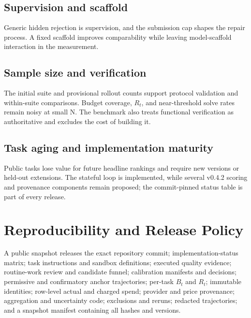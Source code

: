 \documentclass[11pt]{article}
\begin{document}
\subsection{Supervision and scaffold}\hypertarget{133-supervision-and-scaffold}{}\label{133-supervision-and-scaffold}

Generic hidden rejection is supervision, and the submission cap shapes the repair process. A fixed scaffold improves comparability while leaving model-scaffold interaction in the measurement.

\subsection{Sample size and verification}\hypertarget{134-sample-size-and-verification}{}\label{134-sample-size-and-verification}

The initial suite and provisional rollout counts support protocol validation and within-suite comparisons. Budget coverage, $R_t$, and near-threshold solve rates remain noisy at small N. The benchmark also treats functional verification as authoritative and excludes the cost of building it.

\subsection{Task aging and implementation maturity}\hypertarget{135-task-aging-and-implementation-maturity}{}\label{135-task-aging-and-implementation-maturity}

Public tasks lose value for future headline rankings and require new versions or held-out extensions. The stateful loop is implemented, while several v0.4.2 scoring and provenance components remain proposed; the commit-pinned status table is part of every release.

\section{Reproducibility and Release Policy}\hypertarget{14-reproducibility-and-release-policy}{}\label{14-reproducibility-and-release-policy}

A public snapshot releases the exact repository commit; implementation-status matrix; task instructions and sandbox definitions; executed quality evidence; routine-work review and candidate funnel; calibration manifests and decisions; permissive and confirmatory anchor trajectories; per-task $B_t$ and $R_t$; immutable identities; row-level actual and charged spend; provider and price provenance; aggregation and uncertainty code; exclusions and reruns; redacted trajectories; and a snapshot manifest containing all hashes and versions.
\end{document}
